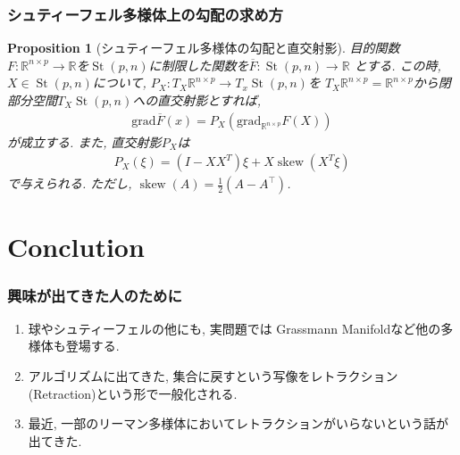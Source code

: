 \documentclass[dvipdfmx,11pt]{beamer}		%
\newtheorem{prop}[defi]{Proposition}
\newcommand{\R}{\mathbb{R}}
\begin{document}
    \begin{frame}
        \frametitle{シュティーフェル多様体上の勾配の求め方}
        \begin{prop}[シュティーフェル多様体の勾配と直交射影]
            目的関数$F:\R^{n\times p}\to\R$を$\operatorname{St}(p, n)$に制限した関数を$\overline{F}:\operatorname{St}(p, n)\to\R$
            とする. この時, $X\in\operatorname{St}(p, n)$について, $P_X : T_{X}\R^{n\times p}\to T_{x}\operatorname{St}(p, n)$を
            $T_{X}\R^{n\times p} = \R^{n\times p}$から閉部分空間$T_{X}\operatorname{St}(p, n)$への直交射影とすれば,
            \begin{align*}
                \mathrm{grad} \overline{F}(x) = P_{X}(\mathrm{grad}_{\R^{n\times p}}F(X))
            \end{align*}
            が成立する. また, 直交射影$P_X$は 
            \begin{align*}
                P_{X}(\xi)=\left(I-X X^{T}\right) \xi+X \operatorname{skew}\left(X^{T} \xi\right)
            \end{align*}
            で与えられる. ただし, $\operatorname{skew}(A) = \frac{1}{2}(A - A^\top)$.
        \end{prop}
    \end{frame}
    \section*{Conclution}
    \begin{frame}
        \frametitle{興味が出てきた人のために}
        \begin{enumerate}
            \item 球やシュティーフェルの他にも, 実問題では Grassmann Manifoldなど他の多様体も登場する.
            \item アルゴリズムに出てきた, 集合に戻すという写像をレトラクション(Retraction)という形で一般化される\cite{absil}. 
            \item 最近, 一部のリーマン多様体においてレトラクションがいらないという話が出てきた\cite{noretract}.
        \end{enumerate}
    \end{frame}
\end{document}
